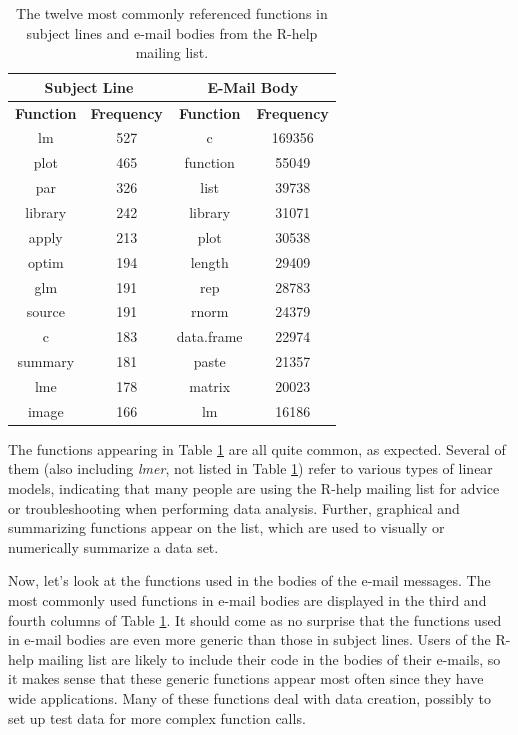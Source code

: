 \documentclass[12pt, a4paper, oneside]{amsart}
\begin{document}
 \begin{table}[ht]
 \centering
 \begin{tabular}{|c|c||c|c|}
 \hline
\multicolumn{2}{|c||}{Subject Line} & \multicolumn{2}{|c|}{E-Mail Body}\\
\hline
\footnotesize{\textbf{Function}}& \footnotesize{\textbf{Frequency}} & \footnotesize{\textbf{Function}}& \footnotesize{\textbf{Frequency}}\\
\hline
lm & 527 & c & 169356 \\
plot & 465 & function & 55049\\
par & 326 & list & 39738\\
library & 242 & library & 31071\\
apply & 213 & plot & 30538\\
optim & 194 & length & 29409\\
glm & 191 & rep & 28783\\
source & 191 & rnorm & 24379\\
c & 183 & data.frame & 22974\\
summary & 181 & paste & 21357\\
lme & 178 & matrix & 20023\\
image & 166 & lm & 16186\\
\hline
\end{tabular}
\caption{The twelve most commonly referenced functions in subject lines and e-mail bodies from the R-help mailing list.}
\label{table:allFcns}
\end{table}

The functions appearing in Table \ref{table:allFcns} are all quite common, as expected.  Several of them (also including \textit{lmer}, not listed in Table \ref{table:allFcns}) refer to various types of linear models, indicating that many people are using the R-help mailing list for advice or troubleshooting when performing data analysis.  Further, graphical and summarizing functions appear on the list, which are used to visually or numerically summarize a data set.

Now, let's look at the functions used in the bodies of the e-mail messages.  The most commonly used functions in e-mail bodies are displayed in the third and fourth columns of Table \ref{table:allFcns}.  It should come as no surprise that the functions used in e-mail bodies are even more generic than those in subject lines.  Users of the R-help mailing list are likely to include their code in the bodies of their e-mails, so it makes sense that these generic functions appear most often since they have wide applications.  Many of these functions deal with data creation, possibly to set up test data for more complex function calls.
\end{document}
